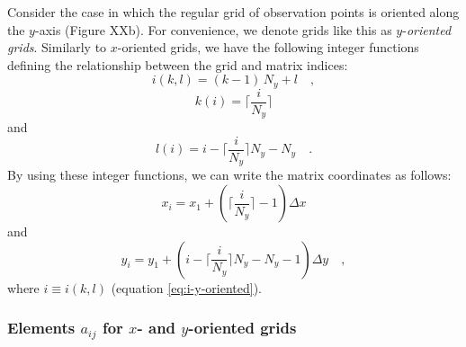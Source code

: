 \documentclass[manuscript,revised]{geophysics}
\begin{document}
Consider the case in which the regular grid of observation points is oriented along the
$y$-axis (Figure XXb). For convenience, we denote grids like this as $y$-\textit{oriented grids}.
Similarly to $x$-oriented grids, we have the following integer functions defining the relationship
between the grid and matrix indices:
\begin{equation}
i(k, l) = (k - 1) \, N_{y} + l \quad ,
\label{eq:i-y-oriented}
\end{equation}
\begin{equation}
k(i) = \Bigg\lceil \frac{i}{N_{y}} \Bigg\rceil
\label{eq:k-y-oriented}
\end{equation}
and
\begin{equation}
l(i) = i - \Bigg\lceil \frac{i}{N_{y}} \Bigg\rceil N_{y} - N_{y} \quad .
\label{eq:l-y-oriented}
\end{equation}
By using these integer functions, we can write the matrix coordinates as follows:
\begin{equation}
x_{i} = x_{1} + \left( \Bigg\lceil \frac{i}{N_{y}} \Bigg\rceil - 1 \right) \Delta x
\label{eq:xi-y-oriented}
\end{equation}
and
\begin{equation}
y_{i} = y_{1} + \left( i - \Bigg\lceil \frac{i}{N_{y}} \Bigg\rceil N_{y} - N_{y} - 1 \right) \Delta y \quad ,
\label{eq:yi-y-oriented}
\end{equation}
where $i \equiv i(k, l)$ (equation \ref{eq:i-y-oriented}).

\subsubsection{Elements $a_{ij}$ for $x$- and $y$-oriented grids}
\end{document}
